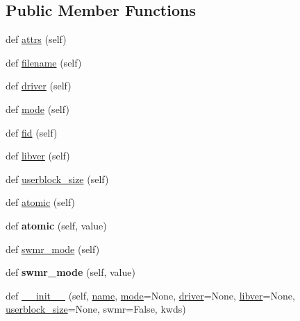 \subsection*{Public Member Functions}
\begin{DoxyCompactItemize}
\item 
def \hyperlink{classh5py__LOCAL_1_1__hl_1_1files_1_1File_ae77f6eee97daf2e9b55d2a35f445625f}{attrs} (self)
\item 
def \hyperlink{classh5py__LOCAL_1_1__hl_1_1files_1_1File_a9913bc96fb657f30ceff2287bc1d5cf5}{filename} (self)
\item 
def \hyperlink{classh5py__LOCAL_1_1__hl_1_1files_1_1File_ae96c51ff7cda44057c432fda1b04f0c9}{driver} (self)
\item 
def \hyperlink{classh5py__LOCAL_1_1__hl_1_1files_1_1File_a0369ffdfe4793561536843be7763c863}{mode} (self)
\item 
def \hyperlink{classh5py__LOCAL_1_1__hl_1_1files_1_1File_a7ca662002af0bea8702c6b2e0538eaed}{fid} (self)
\item 
def \hyperlink{classh5py__LOCAL_1_1__hl_1_1files_1_1File_ab79e97dd839650d1bf7d9e15e57f7e5b}{libver} (self)
\item 
def \hyperlink{classh5py__LOCAL_1_1__hl_1_1files_1_1File_ab37145c90ec9708cba70723af0587708}{userblock\+\_\+size} (self)
\item 
def \hyperlink{classh5py__LOCAL_1_1__hl_1_1files_1_1File_a69a7ca82af7603c2a0f1cc4ee98fc393}{atomic} (self)
\item 
\mbox{\label{classh5py__LOCAL_1_1__hl_1_1files_1_1File_ad84f4f9557cb1c1332914d3738a3ade3}} 
def {\bfseries atomic} (self, value)
\item 
def \hyperlink{classh5py__LOCAL_1_1__hl_1_1files_1_1File_a9cb4e6b0469d77a1926fe7ead8184feb}{swmr\+\_\+mode} (self)
\item 
\mbox{\label{classh5py__LOCAL_1_1__hl_1_1files_1_1File_acf96d79177565a402dee30d0e92fc244}} 
def {\bfseries swmr\+\_\+mode} (self, value)
\item 
def \hyperlink{classh5py__LOCAL_1_1__hl_1_1files_1_1File_a78155dd2356e91286c9222b26f24c53b}{\+\_\+\+\_\+init\+\_\+\+\_\+} (self, \hyperlink{classh5py__LOCAL_1_1__hl_1_1base_1_1HLObject_a75703ed103699785a900c90c5a0d5044}{name}, \hyperlink{classh5py__LOCAL_1_1__hl_1_1files_1_1File_a0369ffdfe4793561536843be7763c863}{mode}=None, \hyperlink{classh5py__LOCAL_1_1__hl_1_1files_1_1File_ae96c51ff7cda44057c432fda1b04f0c9}{driver}=None, \hyperlink{classh5py__LOCAL_1_1__hl_1_1files_1_1File_ab79e97dd839650d1bf7d9e15e57f7e5b}{libver}=None, \hyperlink{classh5py__LOCAL_1_1__hl_1_1files_1_1File_ab37145c90ec9708cba70723af0587708}{userblock\+\_\+size}=None, swmr=False, kwds)

\end{DoxyCompactItemize}
